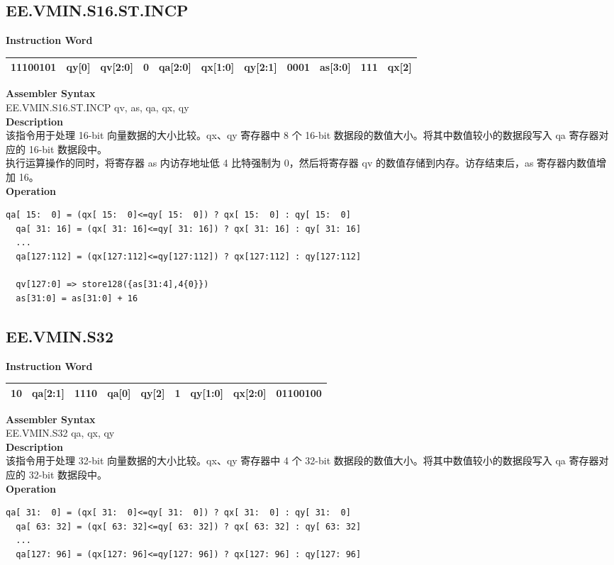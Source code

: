 \clearpage
\subsection{EE.VMIN.S16.ST.INCP}\label{instruction:EEVMINS16STINCP}
\setlength\tabcolsep{6pt}
\textbf{Instruction Word} \\
\begin{tabular}{|c|c|c|c|c|c|c|c|c|c|c|}
	\hline
	11100101 & qy[0] & qv[2:0] & 0 & qa[2:0] & qx[1:0] & qy[2:1] & 0001 & as[3:0] & 111 & qx[2] \\
	\hline
\end{tabular}

\textbf{Assembler Syntax} \\
EE.VMIN.S16.ST.INCP qv, as, qa, qx, qy \\
\textbf{Description} \\
该指令用于处理 16-bit 向量数据的大小比较。qx、qy 寄存器中 8 个 16-bit 数据段的数值大小。将其中数值较小的数据段写入 qa 寄存器对应的 16-bit 数据段中。\\
执行运算操作的同时，将寄存器 as 内访存地址低 4 比特强制为 0，然后将寄存器 qv 的数值存储到内存。访存结束后，as 寄存器内数值增加 16。\\
\textbf{Operation}
\begin{lstlisting}[escapeinside=`?]
  qa[ 15:  0] = (qx[ 15:  0]<=qy[ 15:  0]) ? qx[ 15:  0] : qy[ 15:  0]
  qa[ 31: 16] = (qx[ 31: 16]<=qy[ 31: 16]) ? qx[ 31: 16] : qy[ 31: 16]
  ...
  qa[127:112] = (qx[127:112]<=qy[127:112]) ? qx[127:112] : qy[127:112]

  qv[127:0] => store128({as[31:4],4{0}})
  as[31:0] = as[31:0] + 16
\end{lstlisting}

\clearpage
\subsection{EE.VMIN.S32}\label{instruction:EEVMINS32}
\setlength\tabcolsep{6pt}
\textbf{Instruction Word} \\
\begin{tabular}{|c|c|c|c|c|c|c|c|c|}
	\hline
	10 & qa[2:1] & 1110 & qa[0] & qy[2] & 1 & qy[1:0] & qx[2:0] & 01100100 \\
	\hline
\end{tabular}

\textbf{Assembler Syntax} \\
EE.VMIN.S32 qa, qx, qy \\
\textbf{Description} \\
该指令用于处理 32-bit 向量数据的大小比较。qx、qy 寄存器中 4 个 32-bit 数据段的数值大小。将其中数值较小的数据段写入 qa 寄存器对应的 32-bit 数据段中。\\
\textbf{Operation}
\begin{lstlisting}[escapeinside=`?]
  qa[ 31:  0] = (qx[ 31:  0]<=qy[ 31:  0]) ? qx[ 31:  0] : qy[ 31:  0]
  qa[ 63: 32] = (qx[ 63: 32]<=qy[ 63: 32]) ? qx[ 63: 32] : qy[ 63: 32]
  ...
  qa[127: 96] = (qx[127: 96]<=qy[127: 96]) ? qx[127: 96] : qy[127: 96]
\end{lstlisting}

